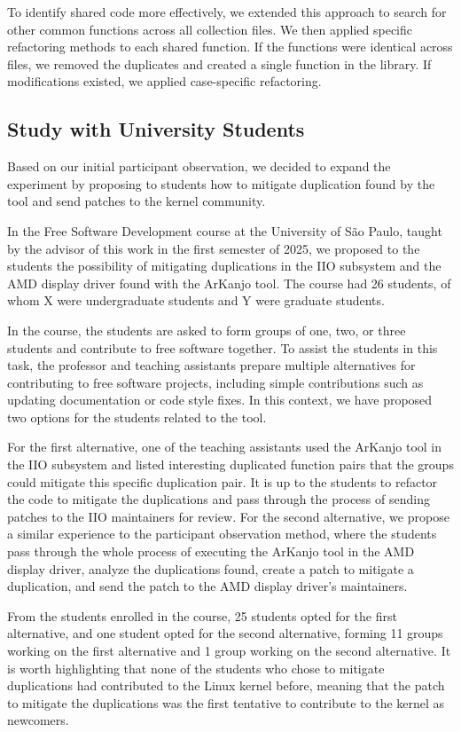 To identify shared code more effectively, we extended this approach to search for other common 
functions across all collection files. We then applied specific refactoring methods to each shared 
function. If the functions were identical across files, we removed the duplicates and created a single 
function in the library. If modifications existed, we applied case-specific refactoring.

\subsection{Study with University Students}

Based on our initial participant observation, we decided to expand the experiment by proposing 
to students how to mitigate duplication found by the tool and send patches to the kernel community.

In the Free Software Development course at the University of São Paulo, taught by the advisor of 
this work in the first semester of 2025, we proposed to the students the possibility of mitigating 
duplications in the IIO subsystem and the AMD display driver found with the ArKanjo tool. 
The course had 26 students, of whom X were undergraduate students and Y were graduate students.

In the course, the students are asked to form groups of one, two, or three students and contribute 
to free software together. To assist the students in this task, the professor and teaching assistants 
prepare multiple alternatives for contributing to free software projects, including simple contributions 
such as updating documentation or code style fixes. In this context, we have proposed two options 
for the students related to the tool.

For the first alternative, one of the teaching assistants used the ArKanjo tool in the IIO subsystem 
and listed interesting duplicated function pairs that the groups could mitigate this specific 
duplication pair. It is up to the students to refactor the code to mitigate the duplications and 
pass through the process of sending patches to the IIO maintainers for review. For the second 
alternative, we propose a similar experience to the participant observation method, where the 
students pass through the whole process of executing the ArKanjo tool in the AMD display driver, 
analyze the duplications found, create a patch to mitigate a duplication, and send the patch to the 
AMD display driver’s maintainers.

From the students enrolled in the course, 25 students opted for the first alternative, and one 
student opted for the second alternative, forming 11 groups working on the first alternative 
and 1 group working on the second alternative. It is worth highlighting that none of the students 
who chose to mitigate duplications had contributed to the Linux kernel before, meaning that the 
patch to mitigate the duplications was the first tentative to contribute to the kernel as newcomers.

